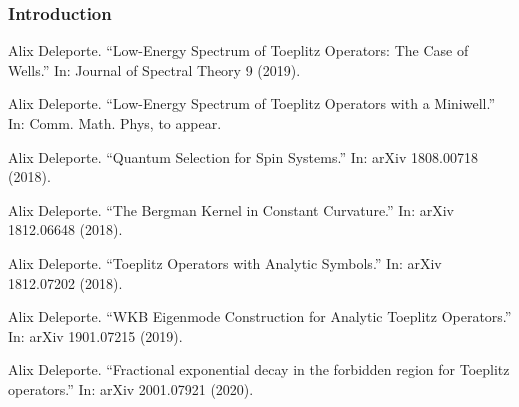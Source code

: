 \documentclass[mathserif]{beamer}
\begin{document}
      \begin{frame}
        \frametitle{Introduction}
        {\footnotesize
        \begin{description}
        \item<1>[{[D. 2019]}] Alix Deleporte. “Low-Energy Spectrum of Toeplitz Operators: The Case
of Wells.” In: Journal of Spectral Theory 9 (2019).
\item<1-2> [{[D. 2020?]}] Alix Deleporte. “Low-Energy Spectrum of Toeplitz Operators with a
Miniwell.” In: Comm. Math. Phys, to appear.
\item<1>[{[D. 2018a++]}] Alix Deleporte. “Quantum Selection for Spin Systems.” In: arXiv
1808.00718 (2018).
\item<1>[{[D. 2018b++]}] Alix Deleporte. “The Bergman Kernel in Constant Curvature.” In:
arXiv 1812.06648 (2018).
\item<1-2>[{[D. 2018c++]}] Alix Deleporte. “Toeplitz Operators with Analytic Symbols.” In: arXiv
1812.07202 (2018).
\item<1>[{[D. 2019++]}] Alix Deleporte. “WKB Eigenmode Construction for Analytic Toeplitz
  Operators.” In: arXiv 1901.07215 (2019).
  \item<1-2>[{[D. 2020++]}] Alix Deleporte. ``Fractional exponential
    decay in the forbidden region for Toeplitz operators.'' In: arXiv
    2001.07921 (2020).
        \end{description}}
      \end{frame}

    
\end{document}
